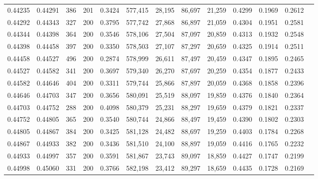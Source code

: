 \begin{tabular}{rrrrrrrrrrrrr}
0.44235 & 0.44291 &   386 & 201 &                                     0.3424 & 577,415 &  28,195 &  86,697 &  21,259 & 0.4299 & 0.1969 & 0.2612 \\
0.44292 & 0.44343 &   327 & 200 &                                     0.3795 & 577,742 &  27,868 &  86,897 &  21,059 & 0.4304 & 0.1951 & 0.2581 \\
0.44344 & 0.44398 &   364 & 200 &                                     0.3546 & 578,106 &  27,504 &  87,097 &  20,859 & 0.4313 & 0.1932 & 0.2548 \\
0.44398 & 0.44458 &   397 & 200 &                                     0.3350 & 578,503 &  27,107 &  87,297 &  20,659 & 0.4325 & 0.1914 & 0.2511 \\
0.44458 & 0.44527 &   496 & 200 &                                     0.2874 & 578,999 &  26,611 &  87,497 &  20,459 & 0.4347 & 0.1895 & 0.2465 \\
0.44527 & 0.44582 &   341 & 200 &                                     0.3697 & 579,340 &  26,270 &  87,697 &  20,259 & 0.4354 & 0.1877 & 0.2433 \\
0.44582 & 0.44646 &   404 & 200 &                                     0.3311 & 579,744 &  25,866 &  87,897 &  20,059 & 0.4368 & 0.1858 & 0.2396 \\
0.44646 & 0.44703 &   347 & 200 &                                     0.3656 & 580,091 &  25,519 &  88,097 &  19,859 & 0.4376 & 0.1840 & 0.2364 \\
0.44703 & 0.44752 &   288 & 200 &                                     0.4098 & 580,379 &  25,231 &  88,297 &  19,659 & 0.4379 & 0.1821 & 0.2337 \\
0.44752 & 0.44805 &   365 & 200 &                                     0.3540 & 580,744 &  24,866 &  88,497 &  19,459 & 0.4390 & 0.1802 & 0.2303 \\
0.44805 & 0.44867 &   384 & 200 &                                     0.3425 & 581,128 &  24,482 &  88,697 &  19,259 & 0.4403 & 0.1784 & 0.2268 \\
0.44867 & 0.44933 &   382 & 200 &                                     0.3436 & 581,510 &  24,100 &  88,897 &  19,059 & 0.4416 & 0.1765 & 0.2232 \\
0.44933 & 0.44997 &   357 & 200 &                                     0.3591 & 581,867 &  23,743 &  89,097 &  18,859 & 0.4427 & 0.1747 & 0.2199 \\
0.44998 & 0.45060 &   331 & 200 &                                     0.3766 & 582,198 &  23,412 &  89,297 &  18,659 & 0.4435 & 0.1728 & 0.2169 \\

\end{tabular}
